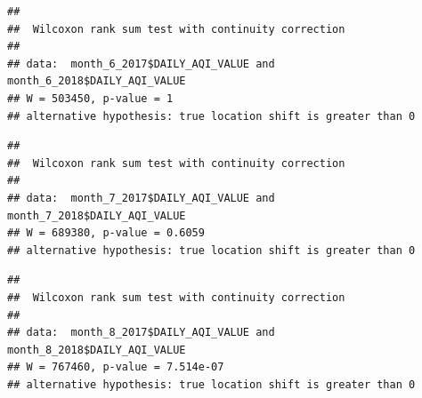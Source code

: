 \documentclass[12pt,]{article}
\newenvironment{Shaded}{\begin{snugshade}}{\end{snugshade}}
\newcommand{\KeywordTok}[1]{\textcolor[rgb]{0.13,0.29,0.53}{\textbf{#1}}}
\newcommand{\DataTypeTok}[1]{\textcolor[rgb]{0.13,0.29,0.53}{#1}}
\newcommand{\DecValTok}[1]{\textcolor[rgb]{0.00,0.00,0.81}{#1}}
\newcommand{\StringTok}[1]{\textcolor[rgb]{0.31,0.60,0.02}{#1}}
\newcommand{\OperatorTok}[1]{\textcolor[rgb]{0.81,0.36,0.00}{\textbf{#1}}}
\newcommand{\NormalTok}[1]{#1}
\begin{document}
\begin{Shaded}
\end{Shaded}

\begin{verbatim}
## 
##  Wilcoxon rank sum test with continuity correction
## 
## data:  month_6_2017$DAILY_AQI_VALUE and month_6_2018$DAILY_AQI_VALUE
## W = 503450, p-value = 1
## alternative hypothesis: true location shift is greater than 0
\end{verbatim}

\begin{Shaded}
\end{Shaded}

\begin{verbatim}
## 
##  Wilcoxon rank sum test with continuity correction
## 
## data:  month_7_2017$DAILY_AQI_VALUE and month_7_2018$DAILY_AQI_VALUE
## W = 689380, p-value = 0.6059
## alternative hypothesis: true location shift is greater than 0
\end{verbatim}

\begin{Shaded}
\end{Shaded}

\begin{verbatim}
## 
##  Wilcoxon rank sum test with continuity correction
## 
## data:  month_8_2017$DAILY_AQI_VALUE and month_8_2018$DAILY_AQI_VALUE
## W = 767460, p-value = 7.514e-07
## alternative hypothesis: true location shift is greater than 0
\end{verbatim}
\end{document}
